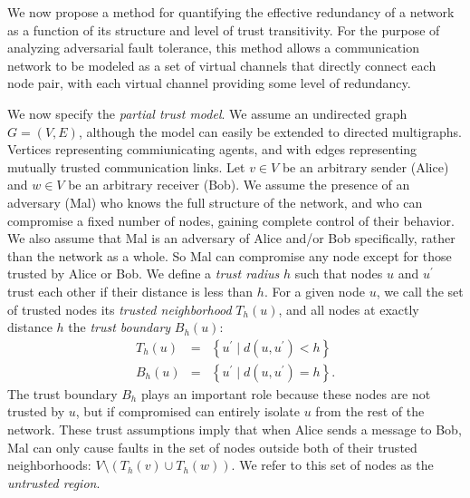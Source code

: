 \documentclass{sig-alternate-05-2015}
\newcommand{\beq}{\begin{eqnarray}}
\newcommand{\eeq}{\end{eqnarray}}
\begin{document}
We now propose a method for quantifying the effective redundancy of a network
as a function of its structure and level of trust transitivity.
For the purpose of analyzing adversarial fault tolerance,
this method allows a communication network
to be modeled as a set of virtual channels that directly
connect each node pair,
with each virtual channel providing some level of redundancy.

We now specify the {\em partial trust model}.
We assume an undirected graph $G = (V,E)$,
although the model can easily be extended to directed multigraphs.
Vertices representing commiunicating agents,
and with edges representing mutually trusted communication links.
Let $v \in V$ be an arbitrary sender (Alice)
and $w \in V$ be an arbitrary receiver (Bob).
We assume the presence of an adversary (Mal) who knows the
full structure of the network,
and who can compromise a fixed number of nodes,
gaining complete control of their behavior.
We also assume that Mal is an adversary of Alice and/or Bob specifically,
rather than the network as a whole.
So Mal can compromise any node except for those trusted by Alice or Bob.
We define a {\em trust radius} $h$ such that nodes $u$ and
$u^\prime$ trust each other if their distance is less than $h$.
For a given node $u$,
we call the set of trusted nodes its
{\em trusted neighborhood} $T_h(u)$,
and all nodes at exactly distance $h$ the
{\em trust boundary} $B_h(u)$:
\beq
T_h(u) &=& \left\{ u^\prime \mid d(u,u^\prime) < h \right\} \\
B_h(u) &=& \left\{ u^\prime \mid d(u,u^\prime) = h \right\}.
\eeq
The trust boundary $B_h$ plays an important role because these nodes are not
trusted by $u$,
but if compromised can entirely isolate $u$ from the rest of the network.
These trust assumptions imply that when Alice sends a message to Bob,
Mal can only cause faults in the set of nodes outside both of their trusted
neighborhoods: $V \setminus \left(T_h(v) \cup T_h(w)\right)$.
We refer to this set of nodes as the {\em untrusted region}.
\end{document}
